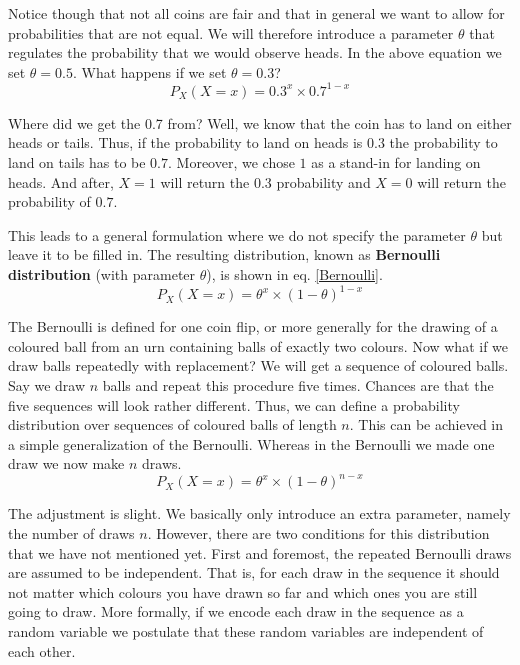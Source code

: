 \documentclass[a4paper,11pt,leqno]{report}
\begin{document}
Notice though that not all coins are fair and that in general we want to allow for probabilities that are not equal. 
We will therefore introduce a parameter $ \theta $ that regulates the probability that we would observe heads. In the
above equation we set $ \theta = 0.5 $. What happens if we set $ \theta = 0.3 $?
\begin{equation}
P_{X}(X=x) = 0.3^{x} \times 0.7^{1-x}
\end{equation}

Where did we get the 0.7 from? Well, we know that the coin has to land on either heads or tails. Thus, if the probability
to land on heads is $ 0.3 $ the probability to land on tails has to be $ 0.7 $. Moreover, we chose $ 1 $ as a stand-in for
landing on heads. And after, $ X = 1 $ will return the $ 0.3 $ probability and $ X = 0 $ will return the probability of $ 0.7 $.

This leads to a general formulation where we do not specify the parameter $ \theta $ but leave it to be filled in. 
The resulting distribution, known as \textbf{Bernoulli distribution} (with parameter $ \theta $), is shown in eq. \ref{Bernoulli}.
\begin{equation}\label{Bernoulli}
P_{X}(X=x) = \theta^{x} \times (1 - \theta)^{1-x}
\end{equation}

The Bernoulli is defined for one coin flip, or more generally for the drawing of a coloured ball from an urn containing balls
of exactly two colours. Now what if we draw balls repeatedly with replacement? We will get a sequence of coloured balls. 
Say we draw $ n $ balls and repeat this procedure five times. Chances are that the five sequences will look rather different.
Thus, we can define a probability distribution over sequences of coloured balls of length $ n $. This can be achieved in a simple generalization
of the Bernoulli. Whereas in the Bernoulli we made one draw we now make $ n $ draws.
\begin{equation}\label{Multinoulli}
P_{X}(X=x) = \theta^{x} \times (1 - \theta)^{n-x}
\end{equation}

The adjustment is slight. We basically only introduce an extra parameter, namely the number of draws $ n $. 
However, there are two conditions for this distribution that we have not mentioned yet. First and foremost,
the repeated Bernoulli draws are assumed to be independent. That is, for each draw in the sequence it should not matter which colours you
have drawn so far and which ones you are still going to draw. More formally, if we encode each draw in the sequence as a random
variable we postulate that these random variables are independent of each other. 
\end{document}
